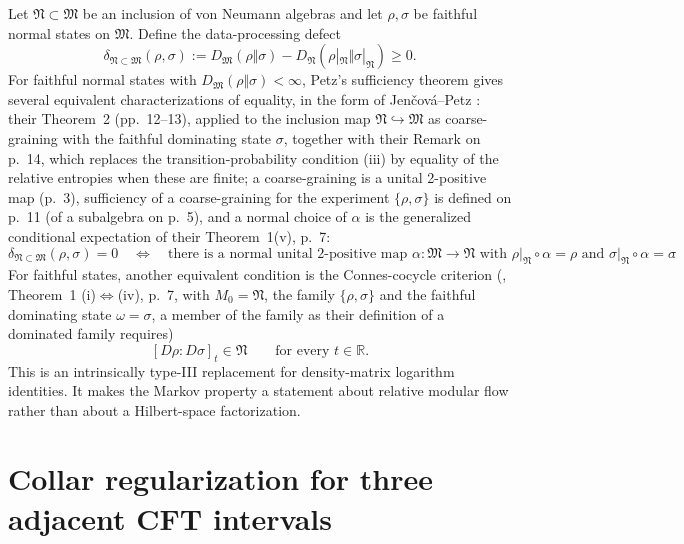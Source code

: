 \documentclass[11pt]{article}
\theoremstyle{accenttheorem}
\theoremstyle{definition}
\newcommand{\cM}{\mathfrak{M}}
\newcommand{\cN}{\mathfrak{N}}
\newcommand{\1}{\mathbf{1}}
\begin{document}
Let \(\cN\subset\cM\) be an inclusion of von Neumann algebras and let \(\rho,\sigma\) be faithful normal states on \(\cM\).  Define the data-processing defect
\begin{equation}\label{eq:abstract-defect}
 \delta_{\cN\subset\cM}(\rho,\sigma)
 :=D_{\cM}(\rho\Vert\sigma)
   -D_{\cN}(\rho|_{\cN}\Vert\sigma|_{\cN})\ge0.
\end{equation}
For faithful normal states with \(D_{\cM}(\rho\Vert\sigma)<\infty\), Petz's sufficiency theorem gives several equivalent characterizations of equality, in the form of Jen\v{c}ov\'a--Petz \cite{JencovaPetz}: their Theorem~2 (pp.~12--13), applied to the inclusion map \(\cN\hookrightarrow\cM\) as coarse-graining with the faithful dominating state \(\sigma\), together with their Remark on p.~14, which replaces the transition-probability condition (iii) by equality of the relative entropies when these are finite; a coarse-graining is a unital 2-positive map (p.~3), sufficiency of a coarse-graining for the experiment \(\{\rho,\sigma\}\) is defined on p.~11 (of a subalgebra on p.~5), and a normal choice of \(\alpha\) is the generalized conditional expectation of their Theorem~1(v), p.~7:
\begin{equation}\label{eq:petz-vn-equivalence}
 \delta_{\cN\subset\cM}(\rho,\sigma)=0
 \quad\Longleftrightarrow\quad
 \text{there is a normal unital 2-positive map $\alpha:\cM\to\cN$ with $\rho|_{\cN}\circ\alpha=\rho$ and $\sigma|_{\cN}\circ\alpha=\sigma$}.
\end{equation}
For faithful states, another equivalent condition is the Connes-cocycle criterion (\cite{JencovaPetz}, Theorem~1 (i)\(\Leftrightarrow\)(iv), p.~7, with \(M_0=\cN\), the family \(\{\rho,\sigma\}\) and the faithful dominating state \(\omega=\sigma\), a member of the family as their definition of a dominated family requires)
\begin{equation}\label{eq:connes-criterion}
 [D\rho:D\sigma]_t\in\cN
 \qquad\text{for every }t\in\mathbb R.
\end{equation}
This is an intrinsically type-III replacement for density-matrix logarithm identities.  It makes the Markov property a statement about relative modular flow rather than about a Hilbert-space factorization.

\section{Collar regularization for three adjacent CFT intervals}
\end{document}
